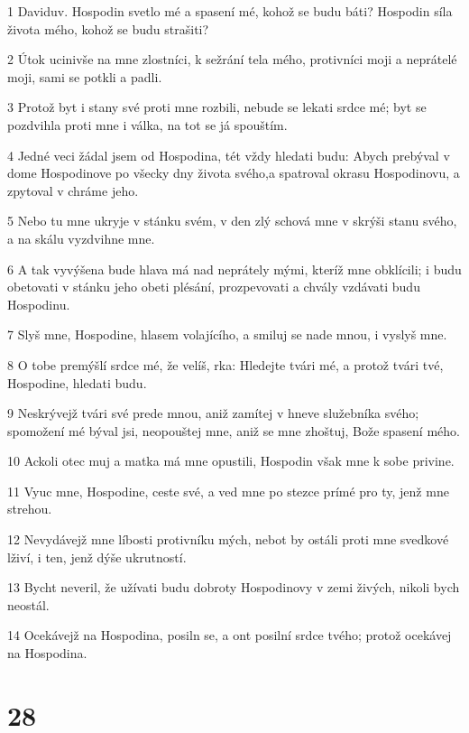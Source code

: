 \par 1 Daviduv. Hospodin svetlo mé a spasení mé, kohož se budu báti? Hospodin síla života mého, kohož se budu strašiti?
\par 2 Útok ucinivše na mne zlostníci, k sežrání tela mého, protivníci moji a neprátelé moji, sami se potkli a padli.
\par 3 Protož byt i stany své proti mne rozbili, nebude se lekati srdce mé; byt se pozdvihla proti mne i válka, na tot se já spouštím.
\par 4 Jedné veci žádal jsem od Hospodina, tét vždy hledati budu: Abych prebýval v dome Hospodinove po všecky dny života svého,a spatroval okrasu Hospodinovu, a zpytoval v chráme jeho.
\par 5 Nebo tu mne ukryje v stánku svém, v den zlý schová mne v skrýši stanu svého, a na skálu vyzdvihne mne.
\par 6 A tak vyvýšena bude hlava má nad neprátely mými, kteríž mne obklícili; i budu obetovati v stánku jeho obeti plésání, prozpevovati a chvály vzdávati budu Hospodinu.
\par 7 Slyš mne, Hospodine, hlasem volajícího, a smiluj se nade mnou, i vyslyš mne.
\par 8 O tobe premýšlí srdce mé, že velíš, rka: Hledejte tvári mé, a protož tvári tvé, Hospodine, hledati budu.
\par 9 Neskrývejž tvári své prede mnou, aniž zamítej v hneve služebníka svého; spomožení mé býval jsi, neopouštej mne, aniž se mne zhoštuj, Bože spasení mého.
\par 10 Ackoli otec muj a matka má mne opustili, Hospodin však mne k sobe privine.
\par 11 Vyuc mne, Hospodine, ceste své, a ved mne po stezce prímé pro ty, jenž mne strehou.
\par 12 Nevydávejž mne líbosti protivníku mých, nebot by ostáli proti mne svedkové lživí, i ten, jenž dýše ukrutností.
\par 13 Bycht neveril, že užívati budu dobroty Hospodinovy v zemi živých, nikoli bych neostál.
\par 14 Ocekávejž na Hospodina, posiln se, a ont posilní srdce tvého; protož ocekávej na Hospodina.

\chapter{28}

